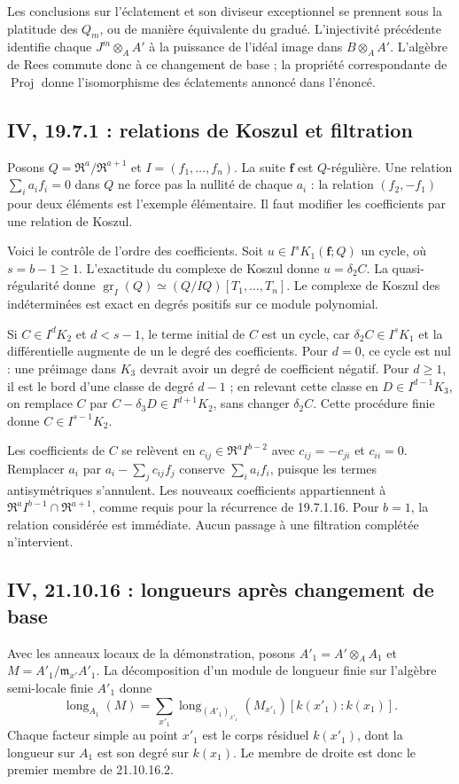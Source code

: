 \documentclass[11pt,a4paper]{article}
\begin{document}
Les conclusions sur l'éclatement et son diviseur exceptionnel se
prennent sous la platitude des $Q_m$, ou de manière équivalente du
gradué. L'injectivité précédente identifie chaque $J^m\otimes_A A'$
à la puissance de l'idéal image dans $B\otimes_A A'$.
L'algèbre de Rees commute donc à ce changement de base ; la propriété
correspondante de $\operatorname{Proj}$ donne l'isomorphisme des
éclatements annoncé dans l'énoncé.

\subsection{IV, 19.7.1 : relations de Koszul et filtration}
\label{note:iv4-koszul}
Posons $Q=\mathfrak R^a/\mathfrak R^{a+1}$ et $I=(f_1,\ldots,f_n)$.
La suite $\mathbf f$ est $Q$-régulière. Une relation
$\sum_i a_if_i=0$ dans $Q$ ne force pas la nullité de chaque $a_i$ :
la relation $(f_2,-f_1)$ pour deux éléments est l'exemple élémentaire.
Il faut modifier les coefficients par une relation de Koszul.

Voici le contrôle de l'ordre des coefficients. Soit
$u\in I^sK_1(\mathbf f;Q)$ un cycle, où $s=b-1\geq1$.
L'exactitude du complexe de Koszul donne $u=\delta_2C$.
La quasi-régularité donne
$\operatorname{gr}_I(Q)\simeq(Q/IQ)[T_1,\ldots,T_n]$.
Le complexe de Koszul des indéterminées est exact en degrés positifs
sur ce module polynomial.

Si $C\in I^dK_2$ et $d<s-1$, le terme initial de $C$ est un cycle,
car $\delta_2C\in I^sK_1$ et la différentielle augmente de un le
degré des coefficients. Pour $d=0$, ce cycle est nul : une préimage
dans $K_3$ devrait avoir un degré de coefficient négatif. Pour
$d\geq1$, il est le bord d'une classe de degré $d-1$ ; en relevant
cette classe en $D\in I^{d-1}K_3$, on remplace $C$ par
$C-\delta_3D\in I^{d+1}K_2$, sans changer $\delta_2C$.
Cette procédure finie donne $C\in I^{s-1}K_2$.

Les coefficients de $C$ se relèvent en
$c_{ij}\in\mathfrak R^a I^{b-2}$ avec
$c_{ij}=-c_{ji}$ et $c_{ii}=0$. Remplacer $a_i$ par
$a_i-\sum_jc_{ij}f_j$ conserve $\sum_i a_if_i$, puisque les termes
antisymétriques s'annulent. Les nouveaux coefficients appartiennent
à $\mathfrak R^a I^{b-1}\cap\mathfrak R^{a+1}$, comme requis
pour la récurrence de 19.7.1.16. Pour $b=1$, la relation considérée
est immédiate. Aucun passage à une filtration complétée n'intervient.

\subsection{IV, 21.10.16 : longueurs après changement de base}
\label{note:iv4-lengths}
Avec les anneaux locaux de la démonstration, posons
$A'_1=A'\otimes_A A_1$ et $M=A'_1/\mathfrak m_{x'}A'_1$.
La décomposition d'un module de longueur finie sur l'algèbre
semi-locale finie $A'_1$ donne
\[
 \operatorname{long}_{A_1}(M)
 =\sum_{x'_1}\operatorname{long}_{(A'_1)_{x'_1}}(M_{x'_1})
       [k(x'_1):k(x_1)].
\]
Chaque facteur simple au point $x'_1$ est le corps résiduel $k(x'_1)$,
dont la longueur sur $A_1$ est son degré sur $k(x_1)$.
Le membre de droite est donc le premier membre de 21.10.16.2.
\end{document}

